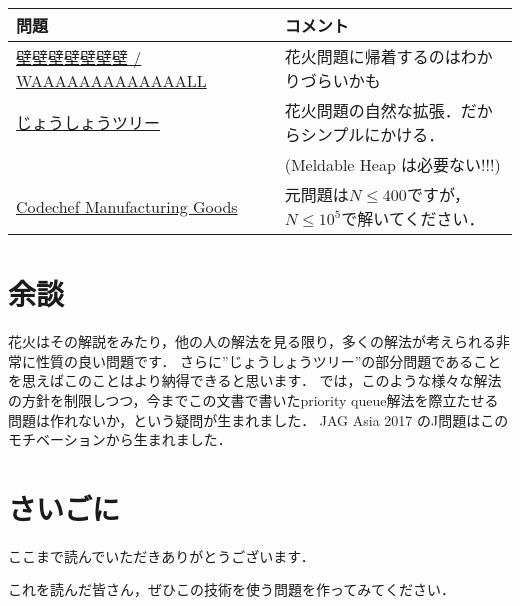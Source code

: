 \documentclass[13pt]{jarticle}
\theoremstyle{nonitalic} %
\begin{document}
\begin{table}[h]
  \begin{tabular}{|l|l|}
    \hline
    問題 & コメント \\
    \hline
    \href{https://kupc2016.contest.atcoder.jp/tasks/kupc2016_h}{壁壁壁壁壁壁壁 / WAAAAAAAAAAAAALL} & 花火問題に帰着するのはわかりづらいかも \\
    \hline
    \href{https://utpc2012.contest.atcoder.jp/tasks/utpc2012_12}{じょうしょうツリー} & 花火問題の自然な拡張．だからシンプルにかける．\\
    & (Meldable Heap は必要ない!!!) \\
    \hline
    \href{https://www.codechef.com/CZIL2017/problems/CZMG17}{Codechef Manufacturing Goods} & 元問題は$N\leq 400$ですが，$N \leq 10^5$で解いてください． \\
    \hline
  \end{tabular}
\end{table}


\section{余談}

花火はその解説をみたり，他の人の解法を見る限り，多くの解法が考えられる非常に性質の良い問題です．
さらに”じょうしょうツリー”の部分問題であることを思えばこのことはより納得できると思います．
では，このような様々な解法の方針を制限しつつ，今までこの文書で書いたpriority queue解法を際立たせる問題は作れないか，という疑問が生まれました．
JAG Asia 2017 のJ問題はこのモチベーションから生まれました．


\section{さいごに}
ここまで読んでいただきありがとうございます．

これを読んだ皆さん，ぜひこの技術を使う問題を作ってみてください．
\end{document}

